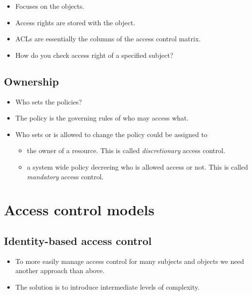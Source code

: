 \begin{frame}
  \begin{itemize}
    \item Focuses on the objects.
    \item Access rights are stored with the object.
    \item ACLs are essentially the columns of the access control matrix.

    \item How do you check access right of a specified subject?
  \end{itemize}
\end{frame}

\subsection{Ownership}

\begin{frame}
  \begin{itemize}
    \item Who sets the policies?

    \item The policy is the governing rules of who may access what.

    \item Who sets or is allowed to change the policy could be assigned to
      \begin{itemize}
        \item the owner of a resource.
          This is called \emph{discretionary} access control.

        \item a system wide policy decreeing who is allowed access or not.
          This is called \emph{mandatory} access control.

      \end{itemize}
  \end{itemize}
\end{frame}


\section{Access control models}

\subsection{Identity-based access control}

\begin{frame}
  \begin{itemize}
    \item To more easily manage access control for many subjects and objects we 
      need another approach than above.

    \item The solution is to introduce intermediate levels of complexity.

  \end{itemize}
\end{frame}

